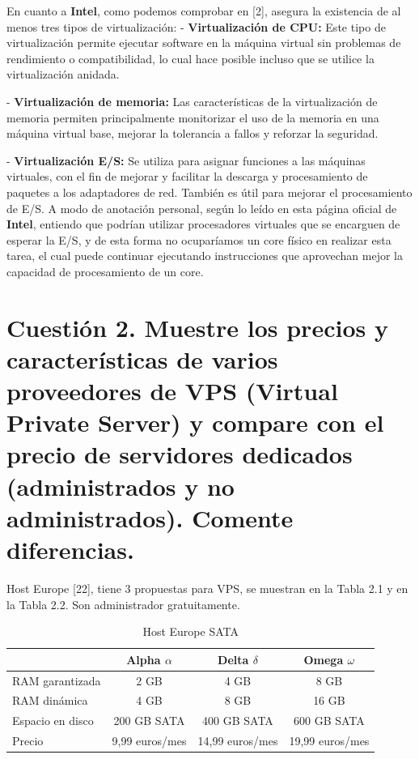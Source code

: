 En cuanto a \textbf{Intel}, como podemos comprobar en [2], asegura la existencia de al menos tres tipos de virtualización:
\newline\newline
- \textbf{Virtualización de CPU:} Este tipo de virtualización permite ejecutar software en la máquina virtual sin problemas de rendimiento o compatibilidad, lo cual hace posible incluso que se utilice la virtualización anidada.

- \textbf{Virtualización de memoria:} Las características de la virtualización de memoria permiten principalmente monitorizar el uso de la memoria en una máquina virtual base, mejorar la tolerancia a fallos y reforzar la seguridad.

- \textbf{Virtualización E/S:} Se utiliza para asignar funciones a las máquinas virtuales, con el fin de mejorar y facilitar la descarga y procesamiento de paquetes a los adaptadores de red. También es útil para mejorar el procesamiento de E/S. 
A modo de anotación personal, según lo leído en esta página oficial de \textbf{Intel}, entiendo que podrían utilizar procesadores virtuales que se encarguen de esperar la E/S, y de esta forma no ocuparíamos un core físico en realizar esta tarea, el cual puede continuar ejecutando instrucciones que aprovechan mejor la capacidad de procesamiento de un core.




\section{Cuestión 2. Muestre los precios y características de varios proveedores de VPS (Virtual Private Server) y compare con el precio de servidores dedicados (administrados y no administrados). Comente diferencias.}

Host Europe [22], tiene 3 propuestas para VPS, se muestran en la Tabla 2.1 y en la Tabla 2.2. Son administrador gratuitamente.

\begin{table}[h]
\begin{tabular}{l | c | c | c }
 & Alpha $\alpha$ & Delta $\delta$ & Omega $\omega$ \\
 \hline
 RAM garantizada& 2 GB & 4 GB & 8 GB \\
 RAM dinámica & 4 GB & 8 GB & 16 GB \\
 Espacio en disco & 200 GB SATA & 400 GB SATA & 600 GB SATA \\
 Precio & 9,99 euros/mes & 14,99 euros/mes &  19,99 euros/mes \\
 \end{tabular}
 \caption{Host Europe SATA}
 \label{hevpssata}
 \end{table}
 
